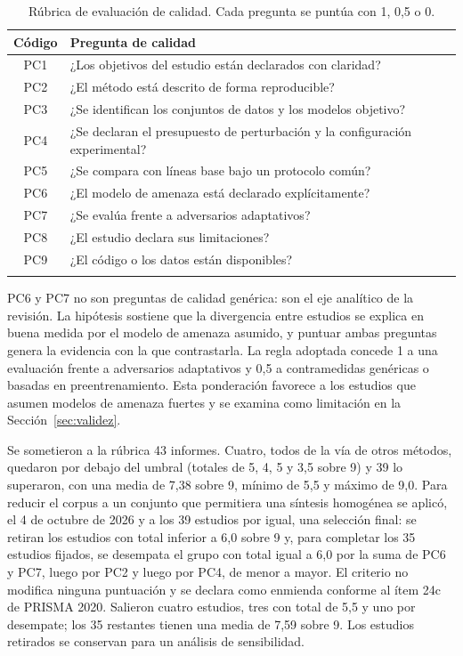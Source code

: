 \documentclass[pdflatex,sn-mathphys-num]{sn-jnl}
\theoremstyle{thmstyleone}
\theoremstyle{thmstyletwo}
\theoremstyle{thmstylethree}
\begin{document}
\begin{table}[h]
\centering
\caption{Rúbrica de evaluación de calidad. Cada pregunta se puntúa con 1, 0,5 o 0.}\label{tab:rubrica}
\begin{tabularx}{\textwidth}{@{}cX@{}}
\toprule
Código & Pregunta de calidad \\
\midrule
PC1 & ¿Los objetivos del estudio están declarados con claridad? \\
PC2 & ¿El método está descrito de forma reproducible? \\
PC3 & ¿Se identifican los conjuntos de datos y los modelos objetivo? \\
PC4 & ¿Se declaran el presupuesto de perturbación y la configuración experimental? \\
PC5 & ¿Se compara con líneas base bajo un protocolo común? \\
PC6 & ¿El modelo de amenaza está declarado explícitamente? \\
PC7 & ¿Se evalúa frente a adversarios adaptativos? \\
PC8 & ¿El estudio declara sus limitaciones? \\
PC9 & ¿El código o los datos están disponibles? \\
\botrule
\end{tabularx}
\end{table}

PC6 y PC7 no son preguntas de calidad genérica: son el eje analítico de la revisión. La hipótesis sostiene que la divergencia entre estudios se explica en buena medida por el modelo de amenaza asumido, y puntuar ambas preguntas genera la evidencia con la que contrastarla. La regla adoptada concede 1 a una evaluación frente a adversarios adaptativos y 0,5 a contramedidas genéricas o basadas en preentrenamiento. Esta ponderación favorece a los estudios que asumen modelos de amenaza fuertes y se examina como limitación en la Sección~\ref{sec:validez}.

Se sometieron a la rúbrica 43 informes. Cuatro, todos de la vía de otros métodos, quedaron por debajo del umbral (totales de 5, 4, 5 y 3,5 sobre 9) y 39 lo superaron, con una media de 7,38 sobre 9, mínimo de 5,5 y máximo de 9,0. Para reducir el corpus a un conjunto que permitiera una síntesis homogénea se aplicó, el 4 de octubre de 2026 y a los 39 estudios por igual, una selección final: se retiran los estudios con total inferior a 6,0 sobre 9 y, para completar los 35 estudios fijados, se desempata el grupo con total igual a 6,0 por la suma de PC6 y PC7, luego por PC2 y luego por PC4, de menor a mayor. El criterio no modifica ninguna puntuación y se declara como enmienda conforme al ítem 24c de PRISMA 2020. Salieron cuatro estudios, tres con total de 5,5 y uno por desempate; los 35 restantes tienen una media de 7{,}59 sobre 9. Los estudios retirados se conservan para un análisis de sensibilidad.
\end{document}
